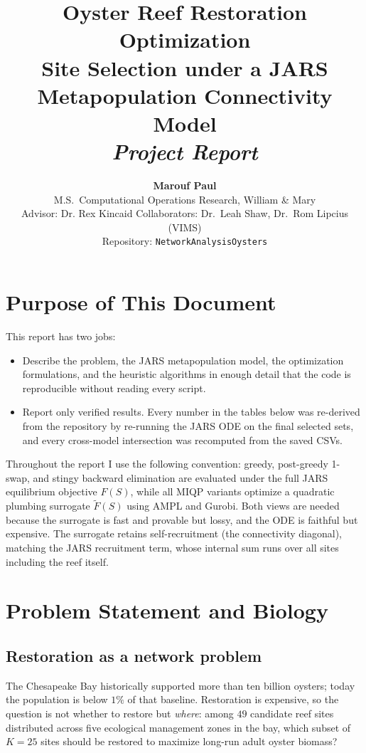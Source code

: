 \documentclass[11pt]{article}
\title{
  \vspace{-2em}
  \color{accent}\textbf{\Huge Oyster Reef Restoration Optimization}\\[0.4em]
  {\Large\color{black!70}\normalfont Site Selection under a JARS Metapopulation Connectivity Model}\\[0.3em]
  {\large\color{rule}\itshape Project Report}
}
\author{
  \textbf{Marouf Paul}\\[0.1em]
  \small M.S.\ Computational Operations Research, William \& Mary\\[0.1em]
  \small Advisor: Dr. Rex Kincaid \quad\textbullet\quad Collaborators: Dr.\ Leah Shaw, Dr.\ Rom Lipcius (VIMS)\\[0.1em]
  \small Repository: \texttt{NetworkAnalysisOysters}
}
\date{}
\begin{document}
\maketitle
\thispagestyle{fancy}

\section{Purpose of This Document}

This report has two jobs:

\begin{itemize}[leftmargin=1.4em, itemsep=0.2em]
  \item Describe the problem, the JARS metapopulation model, the optimization formulations, and the heuristic algorithms in enough detail that the code is reproducible without reading every script.
  \item Report only verified results. Every number in the tables below was re-derived from the repository by re-running the JARS ODE on the final selected sets, and every cross-model intersection was recomputed from the saved CSVs.
\end{itemize}

Throughout the report I use the following convention: greedy, post-greedy 1-swap, and stingy backward elimination are evaluated under the full JARS equilibrium objective $F(S)$, while all MIQP variants optimize a quadratic plumbing surrogate $\tilde{F}(S)$ using AMPL and Gurobi. Both views are needed because the surrogate is fast and provable but lossy, and the ODE is faithful but expensive. The surrogate retains self-recruitment (the connectivity diagonal), matching the JARS recruitment term, whose internal sum runs over all sites including the reef itself.

\section{Problem Statement and Biology}

\subsection{Restoration as a network problem}

The Chesapeake Bay historically supported more than ten billion oysters; today the population is below $1\%$ of that baseline. Restoration is expensive, so the question is not whether to restore but \emph{where}: among $49$ candidate reef sites distributed across five ecological management zones in the bay, which subset of $K=25$ sites should be restored to maximize long-run adult oyster biomass?
\end{document}
